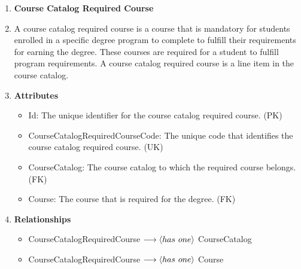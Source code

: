 \documentclass[12pt]{article}
\begin{document}
\begin{appendices}
\begin{enumerate}[label=(\roman*)]
    \item \textbf{Course Catalog Required Course}
    \item[] A course catalog required course is a course that is mandatory for students enrolled in a specific degree program to complete to fulfill their requirements for earning the degree. These courses are required for a student to fulfill program requirements. A course catalog required course is a line item in the course catalog.
    \item[] \textbf{Attributes}
    \begin{itemize}
        \item Id: The unique identifier for the course catalog required course. (PK)
        \item CourseCatalogRequiredCourseCode: The unique code that identifies the course catalog required course. (UK)
        \item CourseCatalog: The course catalog to which the required course belongs. (FK)
        \item Course: The course that is required for the degree. (FK)
    \end{itemize}
    \item[] \textbf{Relationships}
    \begin{itemize}
        \item CourseCatalogRequiredCourse $ \longrightarrow \langle has \hspace{0.125cm} one \rangle $ CourseCatalog
        \item CourseCatalogRequiredCourse $ \longrightarrow \langle has \hspace{0.125cm} one \rangle $ Course
    \end{itemize}


\end{enumerate}
\end{appendices}
\end{document}
